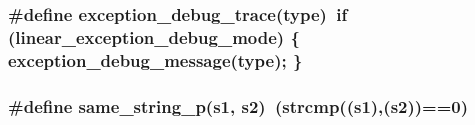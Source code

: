 \subsubsection{\setlength{\rightskip}{0pt plus 5cm}\#define exception\_\-debug\_\-trace(type)\ if (linear\_\-exception\_\-debug\_\-mode) \{ exception\_\-debug\_\-message(type); \}}\label{errors_8c_a2}


\subsubsection{\setlength{\rightskip}{0pt plus 5cm}\#define same\_\-string\_\-p(s1, s2)\ (strcmp((s1),(s2))==0)}\label{errors_8c_a3}


